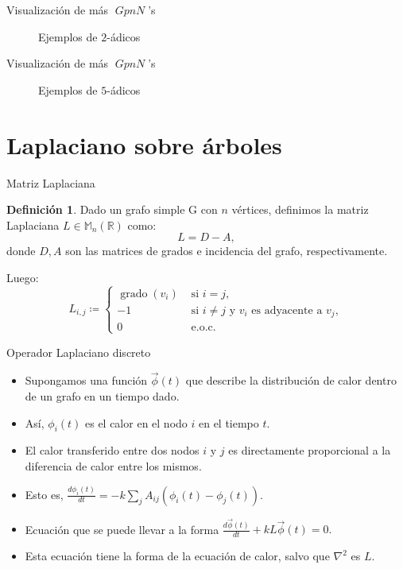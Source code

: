 \documentclass{beamer}
\newcommand{\bb}[1]{\mathbb{#1}}
\theoremstyle{definition}
\numberwithin{equation}{section}
\newcommand{\marine}[1]{\textcolor{defColor}{#1}}
\newtheorem{df}{\marine{Definición}}
\newcommand{\R}{\mathbb{R}}
\DeclareMathOperator{\gpn}{\mathit{{GpnN}}}
\begin{document}
\begin{frame}{Visualización de más $\gpn$'s}
	\begin{figure}
		\caption{Ejemplos de $2$-ádicos}
	\end{figure}	
\end{frame}

\begin{frame}{Visualización de más $\gpn$'s}
	\begin{figure}
		\caption{Ejemplos de $5$-ádicos}
	\end{figure}	
\end{frame}

\section{Laplaciano sobre árboles}
\begin{frame}{Matriz Laplaciana}
	\begin{df}
		Dado un grafo simple G con $n$ vértices, definimos la matriz Laplaciana $L\in \bb{M}_n(\R)$ como:
		$$ L = D-A,$$
		donde $D,A$ son las matrices de grados e incidencia del grafo, respectivamente.
	\end{df}
	Luego:
	$$
	L_{i, j}\coloneqq \left\{\begin{array}{ll}
	\operatorname{grado}\left(v_{i}\right) & \text { si } i=j, \\
	-1 & \text { si } i \neq j \text { y } v_{i} \text { es adyacente a } v_{j}, \\
	0 & \text { e.o.c. }
	\end{array}\right.$$
\end{frame}


\begin{frame}{Operador Laplaciano discreto}
\begin{itemize}[<+- | alert@+>]
	\item Supongamos una función $\vec{\phi}(t)$ que describe la distribución de calor dentro de un grafo en un tiempo dado.
	\item Así, $\phi_i(t)$ es el calor en el nodo $i$ en el tiempo $t$.
	\item El calor transferido entre dos nodos $i$ y $j$ es directamente proporcional a la diferencia de calor entre los mismos.
	\item Esto es, $\frac{d \phi_{i}(t)}{d t} =-k \sum_{j} A_{i j}\left(\phi_{i}(t)-\phi_{j}(t)\right)$.
	\item Ecuación que se puede llevar a la forma $\frac{d \vec{\phi}(t)}{d t}+k L \vec{\phi}(t)=0.$
	\item Esta ecuación tiene la forma de la ecuación de calor, salvo que $\nabla^2$ es $L$.
\end{itemize}
\end{frame}
\end{document}
